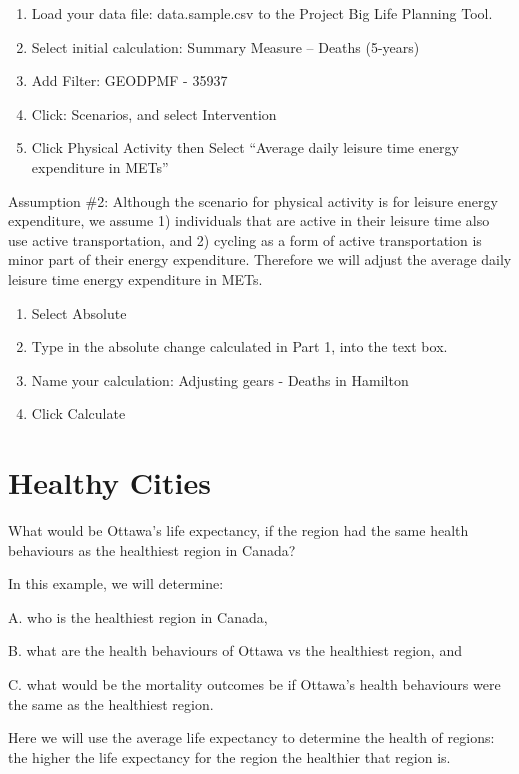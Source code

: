 \documentclass[]{book}
\begin{document}
\begin{enumerate}
\def\labelenumi{\arabic{enumi}.}
\item
  Load your data file: data.sample.csv to the Project Big Life Planning Tool.
\item
  Select initial calculation: Summary Measure -- Deaths (5-years)
\item
  Add Filter: GEODPMF - 35937
\item
  Click: Scenarios, and select Intervention
\item
  Click Physical Activity then Select ``Average daily leisure time energy expenditure in METs''
\end{enumerate}

Assumption \#2: Although the scenario for physical activity is for leisure energy expenditure, we assume 1) individuals that are active in their leisure time also use active transportation, and 2) cycling as a form of active transportation is minor part of their energy expenditure. Therefore we will adjust the average daily leisure time energy expenditure in METs.

\begin{enumerate}
\def\labelenumi{\arabic{enumi}.}
\setcounter{enumi}{5}
\item
  Select Absolute
\item
  Type in the absolute change calculated in Part 1, into the text box.
\item
  Name your calculation: Adjusting gears - Deaths in Hamilton
\item
  Click Calculate
\end{enumerate}

\hypertarget{healthy-cities}{%
\section{Healthy Cities}\label{healthy-cities}}

What would be Ottawa's life expectancy, if the region had the same health behaviours as the healthiest region in Canada?

In this example, we will determine:

A. who is the healthiest region in Canada,

B. what are the health behaviours of Ottawa vs the healthiest region, and

C. what would be the mortality outcomes be if Ottawa's health behaviours were the same as the healthiest region.

Here we will use the average life expectancy to determine the health of regions: the higher the life expectancy for the region the healthier that region is.
\end{document}
